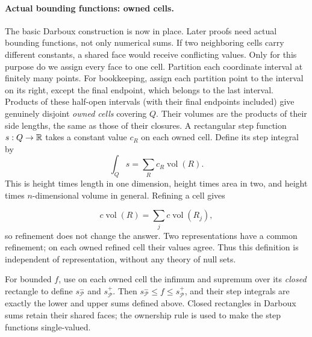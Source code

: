 \paragraph{Actual bounding functions: owned cells.}
The basic Darboux construction is now in place. Later proofs need actual
bounding functions, not only numerical sums. If two neighboring cells
carry different constants, a shared face would receive conflicting values.
Only for this purpose do we assign every face to one cell.
Partition each coordinate interval at finitely many points. For bookkeeping,
assign each partition point to the interval on its right, except the final
endpoint, which belongs to the last interval. Products of these half-open
intervals (with their final endpoints included) give genuinely disjoint
\emph{owned cells} covering $Q$. Their volumes are the products of their
side lengths, the same as those of their closures.
A rectangular step function $s:Q\to\mathbb{R}$ takes a constant value $c_R$
on each owned cell. Define its step integral by
\[
\int_Qs=\sum_R c_R\operatorname{vol}(R).
\]
This is height times length in one dimension, height times area in two,
and height times $n$-dimensional volume in general. Refining a cell gives

\[
c\operatorname{vol}(R)=\sum_j c\operatorname{vol}(R_j),
\]
 so refinement
does not change the answer. Two representations have a common refinement;
on each owned refined cell their values agree. Thus this definition is
independent of representation, without any theory of null sets.

For bounded $f$, use on each owned cell the infimum and supremum over
its \emph{closed} rectangle to define $s^-_{\mathcal P}$ and
$s^+_{\mathcal P}$. Then $s^-_{\mathcal P}\leq f\leq s^+_{\mathcal P}$,
and their step integrals are exactly the lower and upper sums defined above.
Closed rectangles in Darboux sums retain their shared faces; the ownership
rule is used to make the step functions single-valued.


